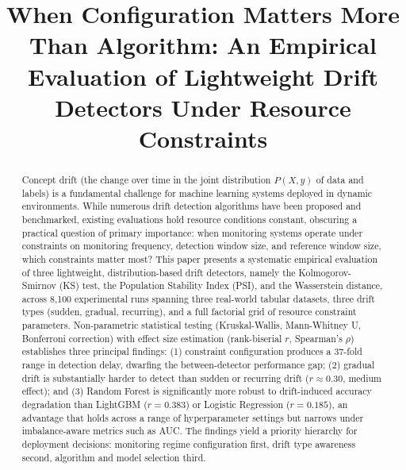 \documentclass[conference]{IEEEtran}
\begin{document}
\title{When Configuration Matters More Than Algorithm: An Empirical Evaluation of Lightweight Drift Detectors Under Resource Constraints}

\author{
}

\maketitle

\begin{abstract}
Concept drift (the change over time in the joint distribution $P(X, y)$ of data and labels) is a fundamental challenge for machine learning systems deployed in dynamic environments. While numerous drift detection algorithms have been proposed and benchmarked, existing evaluations hold resource conditions constant, obscuring a practical question of primary importance: when monitoring systems operate under constraints on monitoring frequency, detection window size, and reference window size, which constraints matter most? This paper presents a systematic empirical evaluation of three lightweight, distribution-based drift detectors, namely the Kolmogorov-Smirnov (KS) test, the Population Stability Index (PSI), and the Wasserstein distance, across 8,100 experimental runs spanning three real-world tabular datasets, three drift types (sudden, gradual, recurring), and a full factorial grid of resource constraint parameters. Non-parametric statistical testing (Kruskal-Wallis, Mann-Whitney U, Bonferroni correction) with effect size estimation (rank-biserial $r$, Spearman's $\rho$) establishes three principal findings: (1) constraint configuration produces a 37-fold range in detection delay, dwarfing the between-detector performance gap; (2) gradual drift is substantially harder to detect than sudden or recurring drift ($r \approx 0.30$, medium effect); and (3) Random Forest is significantly more robust to drift-induced accuracy degradation than LightGBM ($r = 0.383$) or Logistic Regression ($r = 0.185$), an advantage that holds across a range of hyperparameter settings but narrows under imbalance-aware metrics such as AUC. The findings yield a priority hierarchy for deployment decisions: monitoring regime configuration first, drift type awareness second, algorithm and model selection third.
\end{abstract}
\end{document}
